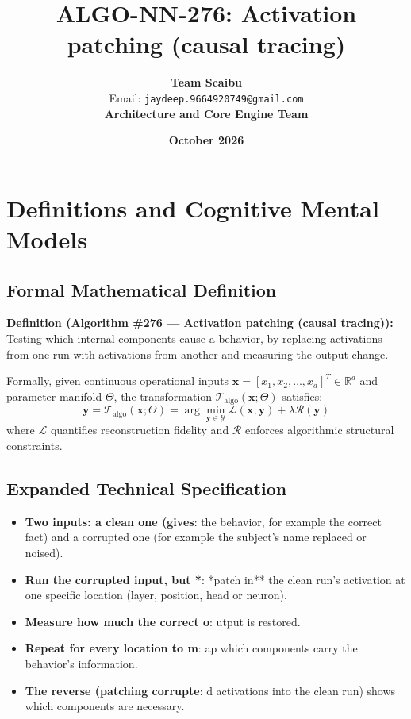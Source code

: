 \documentclass[11pt,a4paper]{article}
\title{\textbf{ALGO-NN-276: Activation patching (causal tracing)}}
\author{\textbf{Team Scaibu} \\ \small Email: \texttt{jaydeep.9664920749@gmail.com} \\ \small \textbf{Architecture and Core Engine Team}}
\date{\textbf{October 2026}}
\theoremstyle{definition}
\begin{document}
\maketitle

\section{Definitions and Cognitive Mental Models}

\subsection{Formal Mathematical Definition}
\textbf{Definition (Algorithm \#276 --- Activation patching (causal tracing)):}
Testing which internal components cause a behavior, by replacing activations from one run with activations from another and measuring the output change.

Formally, given continuous operational inputs $\mathbf{x} = [x_1, x_2, \dots, x_d]^T \in \mathbb{R}^d$ and parameter manifold $\Theta$, the transformation $\mathcal{T}_{\text{algo}}(\mathbf{x}; \Theta)$ satisfies:
{\boldmath
\begin{equation}
\mathbf{y} = \mathcal{T}_{\text{algo}}(\mathbf{x}; \Theta) = \arg\min_{\mathbf{y} \in \mathcal{Y}} \mathcal{L}(\mathbf{x}, \mathbf{y}) + \lambda \mathcal{R}(\mathbf{y})
\end{equation}
}
where $\mathcal{L}$ quantifies reconstruction fidelity and $\mathcal{R}$ enforces algorithmic structural constraints.

\subsection{Expanded Technical Specification}
\begin{itemize}
\item \textbf{Two inputs: a clean one (gives}:  the behavior, for example the correct fact) and a corrupted one (for example the subject's name replaced or noised).
\item \textbf{Run the corrupted input, but *}: *patch in** the clean run's activation at one specific location (layer, position, head or neuron).
\item \textbf{Measure how much the correct o}: utput is restored.
\item \textbf{Repeat for every location to m}: ap which components carry the behavior's information.
\item \textbf{The reverse (patching corrupte}: d activations into the clean run) shows which components are necessary.
\end{itemize}
\end{document}
